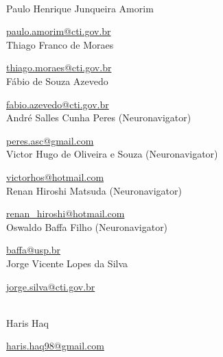 \scalebox{2.0}{\sffamily Authors}
\\

Paulo Henrique Junqueira Amorim

\href{mailto:paulo.amorim@cti.gov.br}{paulo.amorim@cti.gov.br}
\\


Thiago Franco de Moraes

\href{mailto:thiago.moraes@cti.gov.br}{thiago.moraes@cti.gov.br}
\\


Fábio de Souza Azevedo

\href{mailto:fabio.azevedo@cti.gov.br}{fabio.azevedo@cti.gov.br}
\\


André Salles Cunha Peres (Neuronavigator)

\href{mailto:peres.asc@gmail.com}{peres.asc@gmail.com}
\\


Victor Hugo de Oliveira e Souza (Neuronavigator)

\href{mailto:victorhos@hotmail.com}{victorhos@hotmail.com}
\\


Renan Hiroshi Matsuda (Neuronavigator)

\href{mailto:renan\_hiroshi@hotmail.com}{renan\_hiroshi@hotmail.com}
\\


Oswaldo Baffa Filho (Neuronavigator)

\href{mailto:baffa@usp.br}{baffa@usp.br}
\\


Jorge Vicente Lopes da Silva

\href{mailto:jorge.silva@cti.gov.br}{jorge.silva@cti.gov.br}
\\

\newpage

\scalebox{2.0}{\sffamily User Guide Contributor}
\\

Haris Haq

\href{mailto:haris.haq98@gmail.com}{haris.haq98@gmail.com}
\\